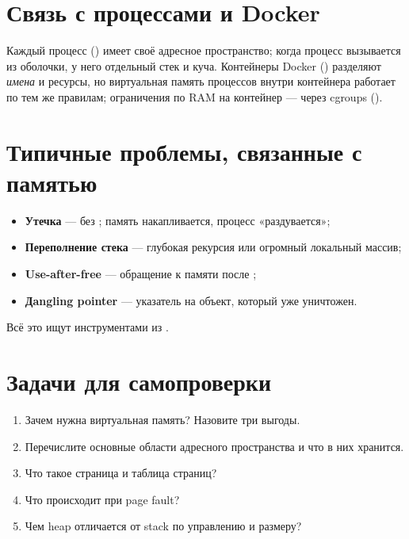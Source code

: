 \section{Связь с процессами и Docker}

Каждый процесс () имеет своё
адресное пространство; когда процесс вызывается из
оболочки, у него отдельный стек и куча. Контейнеры
Docker () разделяют
\emph{имена} и ресурсы, но виртуальная память процессов
внутри контейнера работает по тем же правилам;
ограничения по RAM на контейнер --- через cgroups
().

\section{Типичные проблемы, связанные с памятью}

\begin{itemize}
  \item \textbf{Утечка} ---  без ;
    память накапливается, процесс «раздувается»;
  \item \textbf{Переполнение стека} --- глубокая
    рекурсия или огромный локальный массив;
  \item \textbf{Use-after-free} --- обращение к памяти
    после ;
  \item \textbf{Дangling pointer} --- указатель на
    объект, который уже уничтожен.
\end{itemize}

Всё это ищут инструментами из .

\section{Задачи для самопроверки}
\begin{enumerate}
  \item Зачем нужна виртуальная память? Назовите
    три выгоды.
  \item Перечислите основные области адресного
    пространства и что в них хранится.
  \item Что такое страница и таблица страниц?
  \item Что происходит при page fault?
  \item Чем heap отличается от stack по управлению
    и размеру?
\end{enumerate}
